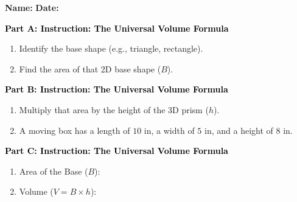\documentclass[12pt, letterpaper, fleqn]{article}
\newcommand{\blanklong}{\underline{\hspace{6.5cm}}}
\begin{document}
\textbf{Name:} \underline{\hspace{5cm}}
\hfill
\textbf{Date:} \underline{\hspace{3cm}}\\

\begin{tcolorbox}[colback=customteal!20]
\large\textcolor{black}{\textbf{Part A: Instruction: The Universal Volume Formula}}
\end{tcolorbox}

\vspace{3mm}

\begin{enumerate}[itemsep=2.2cm, leftmargin=0.6cm]
\item Identify the base shape (e.g., triangle, rectangle).
\item Find the area of that 2D base shape ($B$).
\end{enumerate}

\newpage

\begin{tcolorbox}[colback=customteal!20]
\large\textcolor{black}{\textbf{Part B: Instruction: The Universal Volume Formula}}
\end{tcolorbox}

\vspace{3mm}

\begin{enumerate}[itemsep=2.2cm, leftmargin=0.6cm, resume]
\item Multiply that area by the height of the 3D prism ($h$).
\item A moving box has a length of $10\text{ in}$, a width of $5\text{ in}$, and a height of $8\text{ in}$.
\end{enumerate}

\newpage

\begin{tcolorbox}[colback=customteal!20]
\large\textcolor{black}{\textbf{Part C: Instruction: The Universal Volume Formula}}
\end{tcolorbox}

\vspace{3mm}

\begin{enumerate}[itemsep=2.2cm, leftmargin=0.6cm, resume]
\item Area of the Base ($B$): \blanklong
\item Volume ($V = B \times h$): \blanklong
\end{enumerate}
\end{document}
